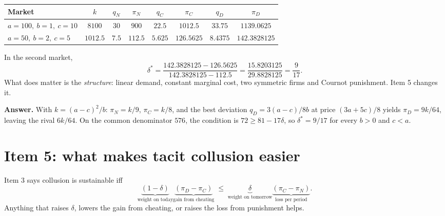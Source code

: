 \documentclass[11pt,a4paper]{article}
\newcommand{\answer}[1]{\begin{tcolorbox}[colback=ans!5,colframe=ans,boxrule=0.6pt,
  left=5pt,right=5pt,top=3pt,bottom=3pt]\textbf{Answer.} #1\end{tcolorbox}}
\begin{document}
\begin{center}
\begin{tabular}{lccccccc}
\toprule
Market & $k$ & $q_N$ & $\pi_N$ & $q_C$ & $\pi_C$ & $q_D$ & $\pi_D$ \\
\midrule
$a=100,\ b=1,\ c=10$ & $8100$ & $30$ & $900$ & $22.5$ & $1012.5$ & $33.75$ & $1139.0625$ \\
$a=50,\ b=2,\ c=5$ & $1012.5$ & $7.5$ & $112.5$ & $5.625$ & $126.5625$ & $8.4375$ & $142.3828125$ \\
\bottomrule
\end{tabular}
\end{center}

In the second market,
\[
\delta^* = \frac{142.3828125 - 126.5625}{142.3828125 - 112.5} = \frac{15.8203125}{29.8828125} = \frac{9}{17}.
\]
What does matter is the \emph{structure}: linear demand, constant
marginal cost, two symmetric firms and Cournot punishment. Item 5 changes it.

\answer{With $k = (a-c)^2/b$: $\pi_N = k/9$, $\pi_C = k/8$, and the best deviation
$q_D = 3(a-c)/8b$ at price $(3a+5c)/8$ yields $\pi_D = 9k/64$, leaving the rival $6k/64$. On the
common denominator $576$, the condition is $72 \ge 81 - 17\delta$, so $\delta^* = 9/17$ for every
$b > 0$ and $c < a$.}

\section{Item 5: what makes tacit collusion easier}

Item 3 says collusion is sustainable iff
\[
\underbrace{(1-\delta)}_{\text{weight on today}}\underbrace{(\pi_D - \pi_C)}_{\text{gain from cheating}}
\;\le\; \underbrace{\delta}_{\text{weight on tomorrow}}\underbrace{(\pi_C - \pi_N)}_{\text{loss per period}} .
\]
Anything that raises $\delta$, lowers the gain from cheating, or raises the loss from punishment helps.
\end{document}
